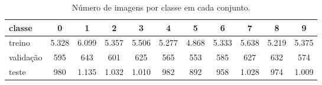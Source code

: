 \begin{table}[!t]
\centering
\caption{Número de imagens por classe em cada conjunto.}
\label{tab:classes}
\begin{tabular}{lcccccccccc}
\hline
classe & 0 & 1 & 2 & 3 & 4 & 5 & 6 & 7 & 8 & 9 \\
\hline
treino & 5.328 & 6.099 & 5.357 & 5.506 & 5.277 & 4.868 & 5.333 & 5.638 & 5.219 & 5.375 \\
validação & 595 & 643 & 601 & 625 & 565 & 553 & 585 & 627 & 632 & 574 \\
teste & 980 & 1.135 & 1.032 & 1.010 & 982 & 892 & 958 & 1.028 & 974 & 1.009 \\
\hline
\end{tabular}
\end{table}